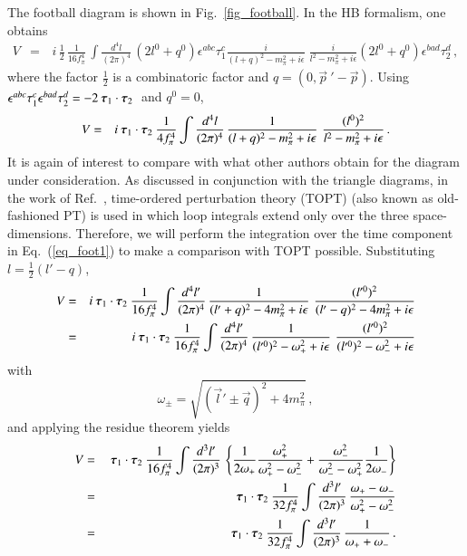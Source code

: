 \documentclass[sort&compress,preprint,3p]{elsarticle}
\newcommand{\bbox}[1]{\mbox{\boldmath $#1$}}
\begin{document}
The football diagram is shown in Fig.~\ref{fig_football}.
In the HB formalism, one obtains
%
\begin{eqnarray}
V &=& \, i \, \frac 1 2 \, \frac{1}{16 f_\pi^4} \,
\int \frac{d^4 l}{(2\pi)^4} \,
(2 l^0+q^0) \epsilon^{abc} \tau^c_1 
\frac{i}{(l+q)^2-m_\pi^2+i\epsilon} \;
\frac{i}{l^2-m_\pi^2+i\epsilon}
(2 l^0+q^0) \epsilon^{bad} \tau^d_2 
\,,
\end{eqnarray}
%
where the factor $\frac 1 2$ is a combinatoric factor
and $q=(0,{\vec p}~' - \vec p)$.
Using 
$\epsilon^{abc} \tau^c_1 \epsilon^{bad} \tau^d_2 =
-2 \: \bbox{\tau}_1 \cdot \bbox{\tau}_2 \: $
and $q^0=0$,
%
\begin{eqnarray}
V &=&  i
\: \bbox{\tau}_1 \cdot \bbox{\tau}_2 \:
\frac{1}{4 f_\pi^4} 
\int \frac{d^4 l}{(2\pi)^4} \,
\frac{1}{(l+q)^2-m_\pi^2+i\epsilon}
\,\,
\frac{(l^0)^2}{l^2-m_\pi^2+i\epsilon}
\,.
\label{eq_foot1}
\end{eqnarray}
%
It is again of interest to compare
with what other authors obtain for the diagram under consideration.
As discussed in conjunction with the triangle diagrams,
in the work of Ref.~\cite{ORK96}, time-ordered perturbation
theory (TOPT) (also known as old-fashioned PT)
is used in which loop integrals extend
only over the three space-dimensions.
Therefore, we will perform the integration over the time
component in Eq.~(\ref{eq_foot1}) to make a comparison
with TOPT possible.
Substituting $l=\frac 1 2 (l'-q)$, 
%
\begin{eqnarray}
V &=& i
\: \bbox{\tau}_1 \cdot \bbox{\tau}_2 \:
\frac{1}{16 f_\pi^4} 
\int \frac{d^4 l'}{(2\pi)^4} \,
\frac{1}{(l'+q)^2-4m_\pi^2+i\epsilon} \,\,
\frac{(l'^0)^2}{(l'-q)^2-4m_\pi^2+i\epsilon}
\nonumber \\
&=& i
\: \bbox{\tau}_1 \cdot \bbox{\tau}_2 \:
\frac{1}{16 f_\pi^4} 
\int \frac{d^4 l'}{(2\pi)^4} \,
\frac{1}{(l'^0)^2-\omega_+^2+i\epsilon} \,\,
\frac{(l'^0)^2}{(l'^0)^2-\omega_-^2+i\epsilon}
\end{eqnarray}
with
\begin{equation}
\omega_\pm = \sqrt{(\vec l'\pm \vec q)^2+4m_\pi^2}
\,,
\end{equation}
%
and applying the residue theorem yields
%
\begin{eqnarray}
V &=& 
\: \bbox{\tau}_1 \cdot \bbox{\tau}_2 \:
\frac{1}{16 f_\pi^4} 
\int \frac{d^3 l'}{(2\pi)^3} \,
\left\{ 
\frac{1}{2\omega_+} \frac{\omega_+^2}{\omega_+^2-\omega_-^2} +
\frac{\omega_-^2}{\omega_-^2-\omega_+^2} \frac{1}{2\omega_-} \right\}
\nonumber \\ &=&
\: \bbox{\tau}_1 \cdot \bbox{\tau}_2 \:
\frac{1}{32 f_\pi^4} 
\int \frac{d^3 l'}{(2\pi)^3} \,
\frac{\omega_+-\omega_-}{\omega_+^2-\omega_-^2}
\nonumber \\ &=&
\: \bbox{\tau}_1 \cdot \bbox{\tau}_2 \:
\frac{1}{32 f_\pi^4} 
\int \frac{d^3 l'}{(2\pi)^3} \,
\frac{1}{\omega_++\omega_-}
\,.
\label{eq_foot2}
\end{eqnarray}
\end{document}

